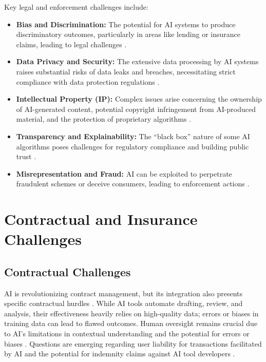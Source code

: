 Key legal and enforcement challenges include:
\begin{itemize}
    \item \textbf{Bias and Discrimination:} The potential for AI systems to produce discriminatory outcomes, particularly in areas like lending or insurance claims, leading to legal challenges \parencite{Gronvall2023}.
    \item \textbf{Data Privacy and Security:} The extensive data processing by AI systems raises substantial risks of data leaks and breaches, necessitating strict compliance with data protection regulations \parencite{Deloitte2023}.
    \item \textbf{Intellectual Property (IP):} Complex issues arise concerning the ownership of AI-generated content, potential copyright infringement from AI-produced material, and the protection of proprietary algorithms \parencite{ThomsonReuters2023}.
    \item \textbf{Transparency and Explainability:} The ``black box'' nature of some AI algorithms poses challenges for regulatory compliance and building public trust \parencite{SirionAI2023}.
    \item \textbf{Misrepresentation and Fraud:} AI can be exploited to perpetrate fraudulent schemes or deceive consumers, leading to enforcement actions \parencite{MWE2023}.
\end{itemize}

\section{Contractual and Insurance Challenges}
\label{sec:contractual_challenges}

\subsection{Contractual Challenges}
AI is revolutionizing contract management, but its integration also presents specific contractual hurdles \parencite{Icertis2023}. While AI tools automate drafting, review, and analysis, their effectiveness heavily relies on high-quality data; errors or biases in training data can lead to flawed outcomes. Human oversight remains crucial due to AI's limitations in contextual understanding and the potential for errors or biases \parencite{Sharma2024}. Questions are emerging regarding user liability for transactions facilitated by AI and the potential for indemnity claims against AI tool developers \parencite{Proskauer2023}.

